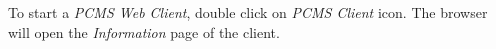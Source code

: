 To start a \emph{PCMS Web Client}, double click on \emph{PCMS Client} icon. 
The browser will open the \emph{Information} page of the client.
